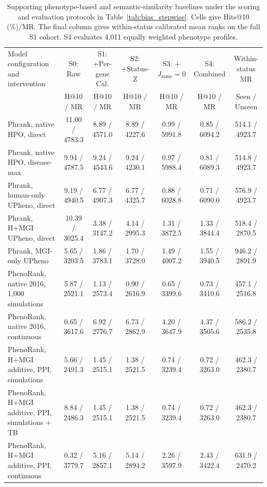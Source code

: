 \begin{landscape}
\begin{table}[p]
\centering\scriptsize
\renewcommand{\arraystretch}{0.86}
\setlength{\tabcolsep}{1.6pt}
\caption{Supporting phenotype-based and semantic-similarity baselines under the scoring and evaluation protocols in Table~\ref{tab:bias_stepwise}. Cells give Hits@10 (\%)/MR. The final column gives within-status calibrated mean ranks on the full S1 cohort. S4 evaluates 4,011 equally weighted phenotype profiles.}
\label{tab:bias_stepwise_external}
\begin{tabular}{lcccccc}
\toprule
Model configuration and intervention & S0: Raw & S1: +Per-gene Cal. & S2: +Status-Z & S3: +$J_{\mathrm{same}}{=}0$ & S4: Combined & Within-status MR \\
 & H@10 / MR & H@10 / MR & H@10 / MR & H@10 / MR & H@10 / MR & Seen / Unseen \\
\midrule
Phrank, native HPO, direct & 11.00 / 4783.3 & 8.89 / 4571.0 & 8.89 / 4227.6 & 0.99 / 5991.8 & 0.85 / 6094.2 & 514.1 / 4923.7 \\
Phrank, native HPO, disease-max & 9.94 / 4787.5 & 9.24 / 4543.6 & 9.24 / 4230.1 & 0.97 / 5988.4 & 0.81 / 6089.3 & 514.8 / 4923.7 \\
Phrank, human-only UPheno, direct & 9.19 / 4940.5 & 6.77 / 4907.3 & 6.77 / 4325.7 & 0.88 / 6028.8 & 0.71 / 6090.0 & 576.9 / 4923.7 \\
Phrank, H+MGI UPheno, direct & 10.39 / 3025.4 & 3.38 / 3147.2 & 4.14 / 2995.3 & 1.31 / 3872.5 & 1.33 / 3844.4 & 518.4 / 2870.5 \\
Phrank, MGI-only UPheno & 5.65 / 3203.5 & 1.86 / 3783.1 & 1.70 / 3728.0 & 1.49 / 4007.2 & 1.55 / 3940.5 & 946.2 / 2891.9 \\
PhenoRank, native 2016, 1,000 simulations & 5.87 / 2521.1 & 1.13 / 2573.4 & 0.90 / 2616.9 & 0.65 / 3399.6 & 0.73 / 3410.6 & 457.1 / 2516.8 \\
PhenoRank, native 2016, continuous & 0.65 / 3617.6 & 6.92 / 2776.7 & 6.73 / 2862.9 & 4.20 / 3647.9 & 4.37 / 3505.6 & 586.2 / 2535.8 \\
PhenoRank, H+MGI additive, PPI, simulations & 5.66 / 2491.3 & 1.45 / 2515.1 & 1.38 / 2521.5 & 0.74 / 3239.4 & 0.72 / 3263.0 & 462.3 / 2380.7 \\
PhenoRank, H+MGI additive, PPI, simulations + TB & 8.84 / 2486.3 & 1.45 / 2515.1 & 1.38 / 2521.5 & 0.74 / 3239.4 & 0.72 / 3263.0 & 462.3 / 2380.7 \\
PhenoRank, H+MGI additive, PPI, continuous & 0.32 / 3779.7 & 5.16 / 2857.1 & 5.14 / 2894.2 & 2.26 / 3597.9 & 2.43 / 3422.4 & 631.9 / 2470.2 \\

\end{tabular}
\end{table}
\end{landscape}
